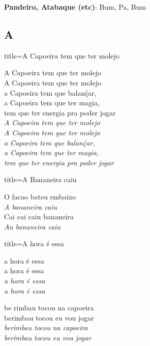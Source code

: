 \documentclass[fontsize=14pt, paper=a4, twoside, DIV=20]{scrreprt} %
\newcommand\chapTOC[1]{
    \chapter*{#1}
    \addcontentsline{toc}{chapter}{#1}
    \markboth{#1}{#1}}
\begin{document}
\textbf{Pandeiro, Atabaque (etc)}: Bum, Pa, Bum
\newpage

\begin{multicols*}{2}
\chapTOC{A}
\begin{song}{title={A Capoeira tem que ter molejo}}
\begin{verse*}
A Capoeira tem que ter molejo \\
A Capoeira tem que ter molejo \\
a Capoeira tem que balanḉar,\\
a Capoeira tem que ter magia,\\
tem que ter energia pra poder jogar\\

    \textit{A Capoeira tem que ter molejo \\
    A Capoeira tem que ter molejo \\
    a Capoeira tem que balanḉar, \\
    a Capoeira tem que ter magia, \\
    tem que ter energia pra poder jogar \\}
\end{verse*}
\end{song}

\begin{song}{title={A Bananeira caiu}}
\begin{verse*}
O facao bateu embaixo\\
\textit{A bananeira caiu} \\
Cai cai caiu bananeira \\
\textit{An bananeira caiu} \\
\end{verse*}
\end{song}
\columnbreak
\begin{song}{title={A hora é essa}}
    \begin{verse*}
        a hora é essa \\
        a hora é essa \\
        \textit{
            a hora é essa \\
            a hora é essa \\        }
    \end{verse*}
\begin{verse*}
 be rimbau tocou na capoeira \\
berimbau tocou eu vou jogar \\
\textit{berimbau tocou na capoeira \\ 
berimbau tocou eu vou jogar}
\end{verse*}


\end{song}
\end{multicols*}
\end{document}
